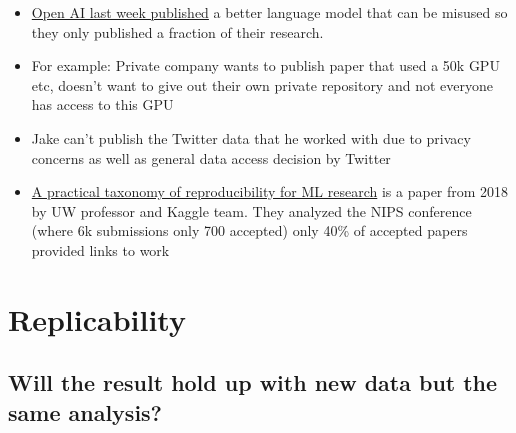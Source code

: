 \begin{itemize}
    \item{\href{https://blog.openai.com/better-language-models/}{Open AI last week published} a better language model that can be misused so they only published a fraction of their research.}
    
    \item For example: Private company wants to publish paper that used a 50k GPU etc, doesn’t want to give out their own private repository and not everyone has access to this GPU
    
    \item Jake can’t publish the Twitter data that he worked with due to privacy concerns as well as general data access decision by Twitter 
    
    \item \href{https://openreview.net/pdf?id=B1eYYK5QgX}{A practical taxonomy of reproducibility for ML research} is a paper from 2018 by UW professor and Kaggle team. They analyzed the NIPS conference (where 6k submissions only 700 accepted) only 40\% of accepted papers provided links to work
    
\end{itemize}

\section{Replicability}

\subsection{Will the result hold up with new data but the same analysis?}


